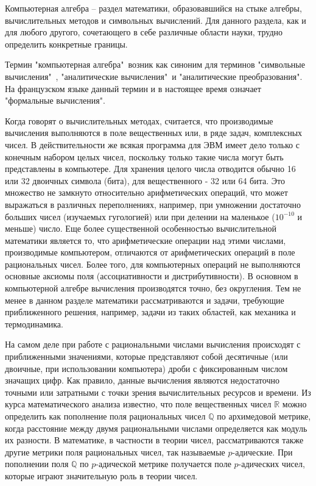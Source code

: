\documentclass[master, och, diploma, times]{sty/SCWorks}
\theoremstyle{plain}
\theoremstyle{definition}
\numberwithin{equation}{section}
\begin{document}
\intro

Компьютерная алгебра -- раздел математики, образовавшийся на стыке алгебры, вычислительных методов и символьных вычислений. Для данного раздела, как и для любого другого, сочетающего в себе различные области науки, трудно определить конкретные границы.

Термин "компьютерная алгебра"\ возник как синоним для терминов "символьные вычисления"\ , "аналитические вычисления"\ и "аналитические преобразования". На французском языке данный термин и в настоящее время означает "формальные вычисления".

Когда говорят о вычислительных методах, считается, что производимые вычисления выполняются в поле вещественных или, в ряде задач, комплексных чисел. В действительности же всякая программа для ЭВМ имеет дело только с конечным набором целых чисел, поскольку только такие числа могут быть представлены в компьютере. Для хранения целого числа отводится обычно 16 или 32 двоичных символа (бита), для вещественного - 32 или 64 бита. Это множество не замкнуто относительно арифметических операций, что может выражаться в различных переполнениях, например, при умножении достаточно больших чисел (изучаемых гугологией) или при делении на маленькое ($10^{-10}$ и меньше) число. Еще более  существенной особенностью вычислительной математики является то, что арифметические операции над этими числами, производимые компьютером, отличаются от арифметических операций в поле рациональных чисел. Более того, для компьютерных операций не выполняются основные аксиомы поля (ассоциативности и дистрибутивности). В основном в компьютерной алгебре вычисления производятся точно, без округления. Тем не менее в данном разделе математики рассматриваются и задачи, требующие приближенного решения, например, задачи из таких областей, как механика и термодинамика.

На самом деле при работе с рациональными числами вычисления происходят с приближенными значениями, которые представляют собой десятичные (или двоичные, при использовании компьютера) дроби с фиксированным числом значащих цифр.  Как правило, данные вычисления являются недостаточно точными или затратными с точки зрения вычислительных ресурсов и времени.
Из курса математического анализа известно, что поле вещественных чисел $\mathbb{R}$ можно определить как пополнение поля рациональных чисел $\mathbb{Q}$ по архимедовой метрике, когда расстояние между двумя рациональными числами определяется как модуль их разности. В математике, в частности в теории чисел, рассматриваются также другие метрики поля рациональных чисел, так называемые $p$-адические. При пополнении поля $\mathbb{Q}$ по $p$-адической метрике получается поле $p$-адических чисел, которые играют значительную роль в теории чисел.
\end{document}
